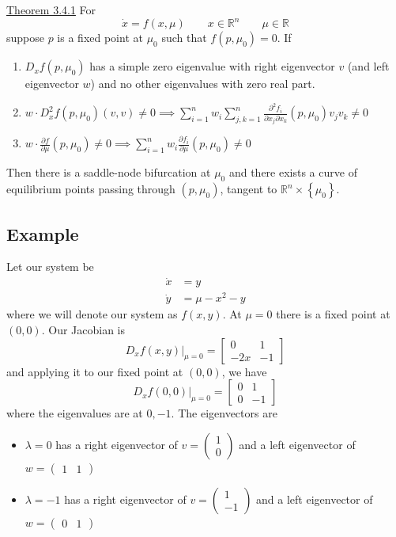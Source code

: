 \documentclass{article}
\begin{document}
\underline{Theorem 3.4.1} For 
\[
\dot{x}=f(x,\mu) \qquad x\in\mathbb{R}^n \qquad \mu\in\mathbb{R}
\]
suppose $p$ is a fixed point at $\mu_0$ such that $f(p,\mu_0)=0$. If 
\begin{enumerate}
    \item $D_x f(p,\mu_0)$ has a simple zero eigenvalue with right eigenvector $v$ (and left eigenvector $w$) and no other eigenvalues with zero real part. 
    \item $w\cdot D^2_x f(p,\mu_0)(v,v)\neq 0\implies \sum^n_{i=1}w_i\sum_{j,k=1}^{n}\frac{\partial^2 f_i}{\partial x_j \partial x_k}(p,\mu_0)v_j v_k\neq 0$
    \item $w\cdot\frac{\partial f}{\partial \mu}(p,\mu_0)\neq0\implies \sum_{i=1}^n w_i\frac{\partial f_i}{\partial \mu}(p,\mu_0)\neq 0$
\end{enumerate}
Then there is a saddle-node bifurcation at $\mu_0$ and there exists a curve of equilibrium points passing through $(p,\mu_0)$, tangent to $\mathbb{R}^n\times \left\{\mu_0\right\}$.

\subsection{Example}
Let our system be 
\begin{align*}
    \dot{x}&= y\\
    \dot{y} &= \mu - x^2 - y
\end{align*}
where we will denote our system as $f(x,y)$. At $\mu=0$ there is a fixed point at $(0,0)$. Our Jacobian is 
\[
D_x f(x,y)\Big|_{\mu=0}=\begin{bmatrix}
    0 & 1 \\ -2x & -1
\end{bmatrix}
\]
and applying it to our fixed point at $(0,0)$, we have 
\[
D_x f(0,0)\Big|_{\mu=0}=\begin{bmatrix}
    0 & 1 \\ 0 & -1
\end{bmatrix}
\]
where the eigenvalues are at $0,-1$. The eigenvectors are 
\begin{itemize}
    \item $\lambda=0$ has a right eigenvector of $v=\begin{pmatrix}
        1\\0
    \end{pmatrix}$ and a left eigenvector of $w=\begin{pmatrix}
        1 & 1
    \end{pmatrix}$
    \item $\lambda=-1$ has a right eigenvector of $v=\begin{pmatrix}
        1\\-1
    \end{pmatrix}$ and a left eigenvector of $w=\begin{pmatrix}
        0 & 1
    \end{pmatrix}$
\end{itemize}
\end{document}
